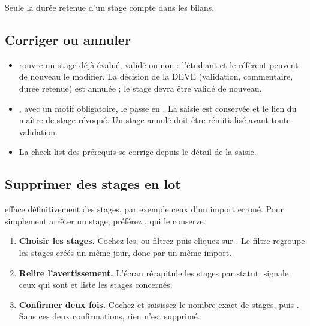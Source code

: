 \documentclass[11pt,a4paper]{article}
\begin{document}

Seule la durée retenue d'un stage  compte dans les bilans.

\subsection{Corriger ou annuler}

\begin{itemize}
  \item {} rouvre un stage
        déjà évalué, validé ou non : l'étudiant et le référent peuvent de nouveau
        le modifier. La décision de la DEVE (validation, commentaire, durée
        retenue) est annulée ; le stage devra être validé de nouveau.
  \item {}, avec un motif obligatoire, le passe en
        . La saisie est conservée et le lien du maître de stage
        révoqué. Un stage annulé doit être réinitialisé avant toute validation.
  \item La check-list des prérequis se corrige depuis le détail de la saisie.
\end{itemize}


\subsection{Supprimer des stages en lot}
\label{sec:suppression}

 efface définitivement des
stages, par exemple ceux d'un import erroné. Pour simplement arrêter un stage,
préférez , qui le conserve.

\begin{enumerate}
  \item \textbf{Choisir les stages.} Cochez-les, ou filtrez puis cliquez sur
        . Le filtre
         regroupe les stages créés un même jour,
        donc par un même import.
  \item \textbf{Relire l'avertissement.} L'écran récapitule les stages par
        statut, signale ceux qui sont  et liste les stages
        concernés.
  \item \textbf{Confirmer deux fois.} Cochez  et saisissez le nombre exact de stages,
        puis . Sans ces deux confirmations, rien
        n'est supprimé.
\end{enumerate}
\end{document}
